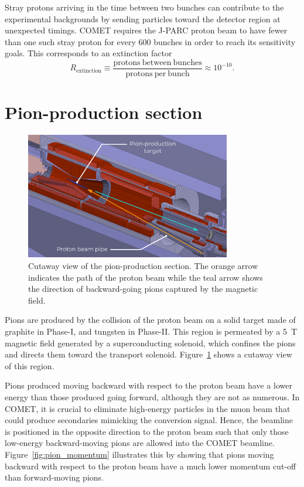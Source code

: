 
Stray protons arriving in the time between two bunches can contribute to the
experimental backgrounds by sending particles toward the detector region at
unexpected timings. COMET requires the J-PARC proton beam to have fewer than one
such stray proton for every 600 bunches in order to reach its sensitivity goals.
This corresponds to an extinction factor
\begin{equation}\label{eq:extinction}
R_\mathrm{extinction} \equiv \frac{\mathrm{protons\ between\
bunches}}{\mathrm{protons\ per\ bunch}} \approx 10^{-10}.
\end{equation}

\section{Pion-production section}

\begin{figure}
    \centering
    \includegraphics[width=0.8\textwidth]{chapter2/pion_production_section.png.pdf}
    \caption{ Cutaway view of the pion-production section. The orange arrow
        indicates the path of the proton beam while the teal arrow shows the
        direction of backward-going pions captured by the magnetic field.}
    \label{fig:pion_production_section}
\end{figure}

Pions are produced by the collision of the proton beam on a solid target made of
graphite in Phase-I, and tungsten in Phase-II. This region is permeated by a
\SI{5}{\tesla} magnetic field generated by a superconducting solenoid, which
confines the pions and directs them toward the transport solenoid.
Figure~\ref{fig:pion_production_section} shows a cutaway view of this
region.


Pions produced moving backward with respect to the proton beam have a lower
energy than those produced going forward, although they are not as numerous. In
COMET, it is crucial to eliminate high-energy particles in the muon beam that
could produce secondaries mimicking the conversion signal. Hence, the beamline
is positioned in the opposite direction to the proton beam such that only those
low-energy backward-moving pions are allowed into the COMET beamline.
Figure~\ref{fig:pion_momentum} illustrates this by showing that pions moving
backward with respect to the proton beam have a much lower momentum cut-off than
forward-moving pions.

